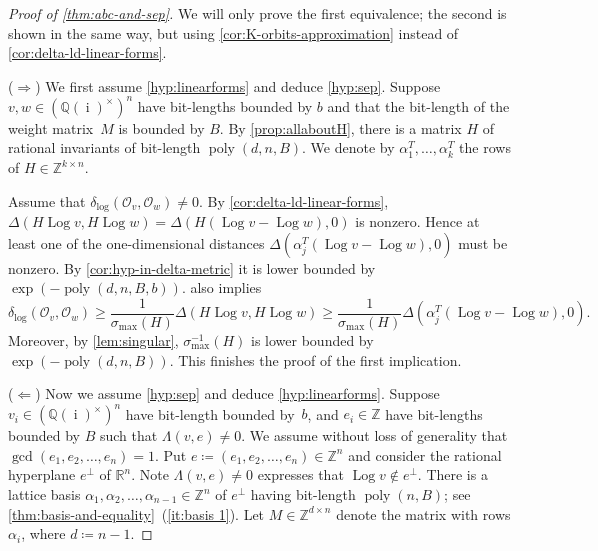 \documentclass[a4paper,USenglish,cleveref,numberwithinsect]{lipics-v2021}
\DeclareMathOperator{\poly}{poly}
\DeclareMathOperator{\sep}{sep}
\DeclareMathOperator{\ii}{i}
\DeclareMathOperator{\Log}{Log}
\newcommand{\distLD}{\delta_{\log}}
\newcommand{\QQ}{\mathbb{Q}}
\newcommand{\ZZ}{\mathbb{Z}}
\newcommand{\RR}{\mathbb{R}}
\newcommand{\OO}{\ensuremath{\mathcal{O}}}
\numberwithin{equation}{section}
\begin{document}
\begin{proof}[Proof of \cref{thm:abc-and-sep}]
We will only prove the first equivalence; the second is shown in the same way,
but using \cref{cor:K-orbits-approximation}
instead of \cref{cor:delta-ld-linear-forms}.

($\Rightarrow$)
We first assume \cref{hyp:linearforms} and deduce \cref{hyp:sep}.
Suppose $v,w\in(\QQ(\ii)^\times)^n$ have bit-lengths bounded by $b$
and that the bit-length of the weight matrix~$M$ is bounded by $B$.
By  \cref{prop:allaboutH}, there is a matrix $H$ of rational invariants
of bit-length $\poly(d,n,B)$.
We denote by $\alpha_1^T,\dots,\alpha_k^T$ the rows of $H\in\ZZ^{k\times n}$.

Assume that $\distLD(\OO_v,\OO_w)\neq 0$.
By \cref{cor:delta-ld-linear-forms},
$\Delta(H\Log v,H\Log w)=\Delta(H(\Log v-\Log w), 0)$ is nonzero.
Hence at least one of the one-dimensional distances
$\Delta(\alpha_j^T (\Log v-\Log w),0)$ %
must be nonzero.
By \cref{cor:hyp-in-delta-metric} it
is lower bounded by $\exp(-\poly(d,n,B,b))$.
 also implies
\begin{equation}\label{eq:form-lower-bound}
	\distLD(\OO_v,\OO_w) \geq \frac{1}{\sigma_{\max}(H)} \Delta(H\Log v, H\Log w)
    \ge \frac{1}{\sigma_{\max}(H)} \Delta(\alpha_j^T (\Log v-\Log w),0) .
\end{equation}
Moreover, by \cref{lem:singular},
$\sigma^{-1}_{\max}(H)$ is lower bounded by $\exp(-\poly(d,n,B))$.
This
finishes the proof of the first implication.

($\Leftarrow$) Now we assume \cref{hyp:sep} and deduce \cref{hyp:linearforms}.
Suppose $v_i\in(\QQ(\ii)^\times)^n$ have bit-length bounded by~$b$,
and $e_i\in\ZZ$ have bit-lengths bounded by $B$ such that $\Lambda(v,e)\neq 0$.
We assume without loss of generality that $\gcd(e_1,e_2,\dots,e_n)=1$.
Put $e\coloneqq(e_1,e_2,\dots,e_n)\in\ZZ^n$ and consider
the rational hyperplane $e^{\perp}$ of $\RR^n$.
Note $\Lambda(v,e)\neq 0$ expresses that $\Log v \not\in e^{\perp}$.
There is a lattice basis $\alpha_1,\alpha_2,\dots,\alpha_{n-1}\in\ZZ^n$ of $e^{\perp}$
having bit-length $\poly(n,B)$;
see \cref{thm:basis-and-equality}~(\ref{it:basis 1}).
Let $M\in\ZZ^{d\times n}$ denote the matrix with rows $\alpha_i$,
where $d\coloneqq n-1$.


\end{proof}
\end{document}
